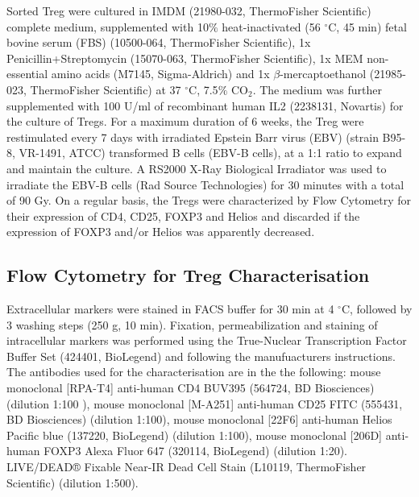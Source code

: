\documentclass[oneside, 10pt, a4paper, twocolumn]{article}
\begin{document}
{Sorted Treg were cultured in IMDM (21980-032, ThermoFisher Scientific) complete medium, supplemented with 10$\%$ heat-inactivated (56 $^\circ$C, 45 min) fetal bovine serum (FBS) (10500-064, ThermoFisher Scientific), 1x Penicillin+Streptomycin (15070-063, ThermoFisher Scientific), 1x MEM non-essential amino acids (M7145, Sigma-Aldrich) and 1x $\beta$-mercaptoethanol (21985-023, ThermoFisher Scientific) at 37 $^\circ$C, 7.5$\%$ CO$_2$. The medium was further supplemented with 100 U/ml of recombinant human IL2 (2238131, Novartis) for the culture of Tregs. For a maximum duration of 6 weeks, the Treg were restimulated every 7 days with irradiated Epstein Barr virus (EBV) (strain B95-8, VR-1491, ATCC) transformed B cells (EBV-B cells), at a 1:1 ratio to expand and maintain the culture. A RS2000 X-Ray Biological Irradiator was used to irradiate the EBV-B cells (Rad Source Technologies) for 30 minutes with a total of 90 Gy. 
On a regular basis, the Tregs were characterized by Flow Cytometry for their expression of CD4, CD25, FOXP3 and Helios and discarded if the expression of FOXP3 and/or Helios was apparently decreased.


\enlargethispage*{\baselineskip}

\subsection{Flow Cytometry for Treg Characterisation}
Extracellular markers were stained in FACS buffer for 30 min at 4 $^\circ$C, followed by 3 washing steps (250 g, 10 min). Fixation, permeabilization and staining of intracellular markers was performed using the True-Nuclear Transcription Factor Buffer Set (424401, BioLegend) and following the manufuacturers instructions. The antibodies used for the characterisation are in the  the following: mouse monoclonal [RPA-T4] anti-human CD4 BUV395 (564724, BD Biosciences) (dilution 1:100 ), mouse monoclonal [M-A251] anti-human CD25 FITC (555431, BD Biosciences) (dilution 1:100), mouse monoclonal [22F6] anti-human Helios Pacific blue (137220, BioLegend) (dilution 1:100), mouse monoclonal [206D] anti-human FOXP3 Alexa Fluor 647 (320114, BioLegend) (dilution 1:20). LIVE/DEAD® Fixable Near-IR Dead Cell Stain (L10119, ThermoFisher Scientific) (dilution 1:500).

}
\end{document}
